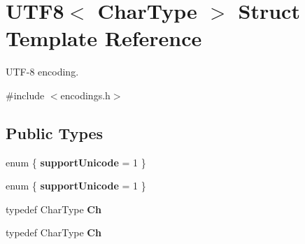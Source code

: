 \hypertarget{struct_u_t_f8}{}\section{U\+T\+F8$<$ Char\+Type $>$ Struct Template Reference}
\label{struct_u_t_f8}


U\+T\+F-\/8 encoding.  




{\ttfamily \#include $<$encodings.\+h$>$}

\subsection*{Public Types}
\begin{DoxyCompactItemize}
\item 
enum \{ {\bfseries support\+Unicode} = 1
 \}\hypertarget{struct_u_t_f8_a6d7cd5f1f72db45d041344c35f47da74}{}\label{struct_u_t_f8_a6d7cd5f1f72db45d041344c35f47da74}

\item 
enum \{ {\bfseries support\+Unicode} = 1
 \}\hypertarget{struct_u_t_f8_a82cc428da966a1fc6cd270ee93522be9}{}\label{struct_u_t_f8_a82cc428da966a1fc6cd270ee93522be9}

\item 
typedef Char\+Type {\bfseries Ch}\hypertarget{struct_u_t_f8_a8e78c8113f3660178d8121b7d3e55890}{}\label{struct_u_t_f8_a8e78c8113f3660178d8121b7d3e55890}

\item 
typedef Char\+Type {\bfseries Ch}\hypertarget{struct_u_t_f8_a8e78c8113f3660178d8121b7d3e55890}{}\label{struct_u_t_f8_a8e78c8113f3660178d8121b7d3e55890}

\end{DoxyCompactItemize}

